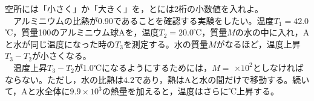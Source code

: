 \hakosyokika
\item
    \begin{mawarikomi}{100pt}{}
空所には「小さく」か「大きく」を，とには2桁の小数値を入れよ。\\
    ~~アルミニウムの比熱が0.90であることを確認する実験をしたい。温度$T_1=42.0$℃，質量100のアルミニウム球Aを，温度$T_2=20.0$℃，質量$M$の水の中に入れ，Aと水が同じ温度になった時の$T_3$を測定する。水の質量$M$が\Hako なるほど，温度上昇$T_3-T_2$が小さくなる。\\
    ~~温度上昇$T_3-T_2$が1.0℃になるようにするためには，$M=$ \Hako $\times 10^2$としなければならない。ただし，水の比熱は$4.2$であり，熱はAと水の間だけで移動する。続いて，Aと水全体に$9.9\times 10^3$の熱量を加えると，温度はさらに\Hako ℃上昇する。
    \end{mawarikomi}